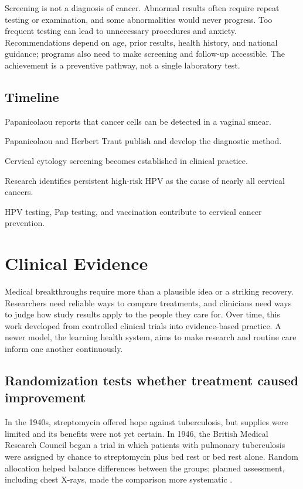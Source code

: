 \documentclass[12pt,oneside]{book}
\begin{document}
Screening is not a diagnosis of cancer. Abnormal results often require
repeat testing or examination, and some abnormalities would never progress.
Too frequent testing can lead to unnecessary procedures and anxiety.
Recommendations depend on age, prior results, health history, and national
guidance; programs also need to make screening and follow-up accessible.
The achievement is a preventive pathway, not a single laboratory test.

\section*{Timeline}
\begin{description}[leftmargin=2.3cm,style=nextline]
  \item[1928] Papanicolaou reports that cancer cells can be detected in a vaginal smear.
  \item[1941--1943] Papanicolaou and Herbert Traut publish and develop the diagnostic method.
  \item[Mid-twentieth century] Cervical cytology screening becomes established in clinical practice.
  \item[Late twentieth century] Research identifies persistent high-risk HPV as the cause of nearly all cervical cancers.
  \item[Today] HPV testing, Pap testing, and vaccination contribute to cervical cancer prevention.
\end{description}
\chapter[Clinical Evidence]{Clinical Evidence}

Medical breakthroughs require more than a plausible idea or a striking recovery.
Researchers need reliable ways to compare treatments, and clinicians need ways
to judge how study results apply to the people they care for. Over time, this
work developed from controlled clinical trials into evidence-based practice.
A newer model, the learning health system, aims to make research and routine
care inform one another continuously.

\section{Randomization tests whether treatment caused improvement}
In the 1940s, streptomycin offered hope against tuberculosis, but supplies were
limited and its benefits were not yet certain. In 1946, the British Medical
Research Council began a trial in which patients with pulmonary tuberculosis
were assigned by chance to streptomycin plus bed rest or bed rest alone.
Random allocation helped balance differences between the groups; planned
assessment, including chest X-rays, made the comparison more systematic
\cite{mrcStreptomycin1948,randomizationHistory}.
\end{document}
